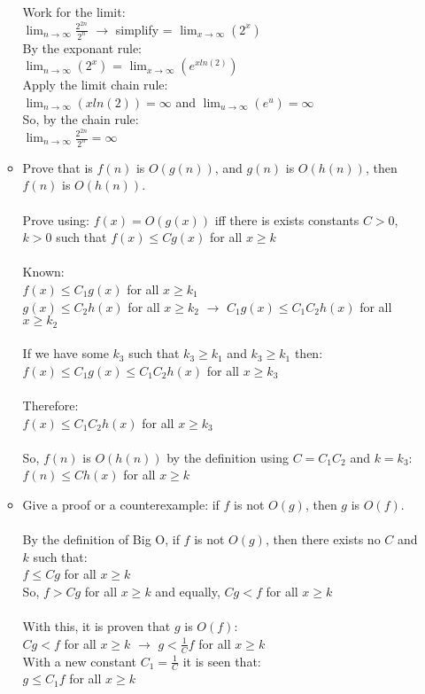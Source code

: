 \documentclass[11pt]{article}
\begin{document}
\begin{enumerate}
\begin{itemize}
Work for the limit:\\
$\lim_{n\to\infty}\frac{2^{2n}}{2^n}$ $\to$ simplify = $\lim_{x\to\infty}(2^x)$\\
By the exponant rule:\\
$\lim_{n\to\infty}(2^x)$ = $\lim_{x\to\infty}(e^{xln(2)})$\\
Apply the limit chain rule:\\
$\lim_{n\to\infty}(xln(2)) = \infty$ and $\lim_{u\to\infty}(e^u) = \infty$\\
So, by the chain rule:\\
$\lim_{n\to\infty}\frac{2^{2n}}{2^n} = \infty$\
\\
\item Prove that is $f(n)$ is $O(g(n))$, and $g(n)$ is $O(h(n))$, then $f(n)$ is $O(h(n))$.\\\\
Prove using: $f(x) = O(g(x))$ iff there is exists constants $C > 0$, $k>0$ such that $f(x) \leq Cg(x)$ for all $x \geq k$ \\\\
Known:\\
$f(x) \leq C_1g(x)$ for all $x \geq k_1$\\
$g(x) \leq C_2h(x)$ for all $x \geq k_2$ $\to$ $C_1g(x) \leq C_1C_2h(x)$ for all $x \geq k_2$\\\\
If we have some $k_3$ such that $k_3 \geq k_1$ and $k_3 \geq k_1$ then:\\
$f(x) \leq C_1g(x) \leq C_1C_2h(x)$ for all $x \geq k_3$\\\\
Therefore:\\
$f(x) \leq C_1C_2h(x)$ for all $x \geq k_3$\\\\
So, $f(n)$ is $O(h(n))$ by the definition using $C = C_1C_2$ and $k = k_3$:\\
$f(n) \leq Ch(x)$ for all $x \geq k$\\


\item Give a proof or a counterexample: if $f$ is not $O(g)$, then $g$ is $O(f)$.\\\\
By the definition of Big O, if $f$ is not $O(g)$, then there exists no $C$ and $k$ such that:\\
$f \leq Cg$ for all $x \geq k$\\ 
So, $f > Cg$ for all $x \geq k$ and equally, $Cg < f$ for all $x \geq k$\\\\
With this, it is proven that $g$ is $O(f)$:\\
 $Cg < f$ for all $x \geq k$ $\to$ $g<\frac{1}{C}f$ for all $x \geq k$\\
 With a new constant $C_1 = \frac{1}{C}$ it is seen that:\\
 $g \leq C_1f$ for all $x \geq k$\\ 


\end{itemize}
\end{enumerate}
\end{document}
